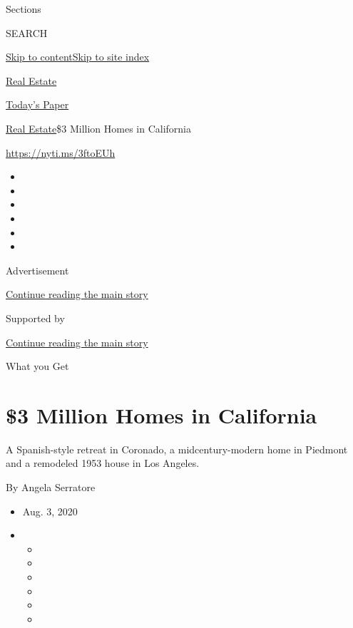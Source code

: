 Sections

SEARCH

\protect\hyperlink{site-content}{Skip to
content}\protect\hyperlink{site-index}{Skip to site index}

\href{https://www.nytimes.com/section/realestate}{Real Estate}

\href{https://myaccount.nytimes.com/auth/login?response_type=cookie\&client_id=vi}{}

\href{https://www.nytimes.com/section/todayspaper}{Today's Paper}

\href{/section/realestate}{Real Estate}\textbar{}\$3 Million Homes in
California

\url{https://nyti.ms/3ftoEUh}

\begin{itemize}
\item
\item
\item
\item
\item
\item
\end{itemize}

Advertisement

\protect\hyperlink{after-top}{Continue reading the main story}

Supported by

\protect\hyperlink{after-sponsor}{Continue reading the main story}

What you Get

\hypertarget{3-million-homes-in-california}{%
\section{\$3 Million Homes in
California}\label{3-million-homes-in-california}}

A Spanish-style retreat in Coronado, a midcentury-modern home in
Piedmont and a remodeled 1953 house in Los Angeles.

By Angela Serratore

\begin{itemize}
\item
  Aug. 3, 2020
\item
  \begin{itemize}
  \item
  \item
  \item
  \item
  \item
  \item
  \end{itemize}
\end{itemize}


